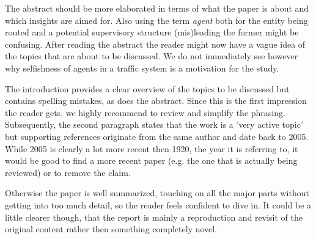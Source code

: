 \documentclass[../review.tex]{subfiles}
\begin{document}
The abstract should be more elaborated in terms of what the paper is about and which insights are aimed for. Also using the term \textit{agent} both for the entity being routed and a potential supervisory structure (mis)leading the former might be confusing. After reading the abstract the reader might now have a vague idea of the topics that are about to be discussed. We do not immediately see however why selfishness of agents in a traffic system is a motivation for the study.

The introduction provides a clear overview of the topics to be discussed but contains spelling mistakes, as does the abstract. Since this is the first impression the reader gets, we highly recommend to review and simplify the phrasing. Subsequently, the second paragraph states that the work is a 'very active topic' but supporting references originate from the same author and date back to 2005. While 2005 is clearly a lot more recent then 1920, the year it is referring to, it would be good to find a more recent paper (e.g. the one that is actually being reviewed) or to remove the claim.

Otherwise the paper is well summarized, touching on all the major parts without getting into too much detail, so the reader feels confident to dive in. It could be a little clearer though, that the report is mainly a reproduction and revisit of the original content rather then something completely novel.
\end{document}
